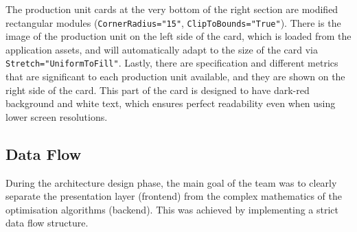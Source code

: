 The production unit cards at the very bottom of the right section are modified rectangular modules (\texttt{CornerRadius="15"}, \texttt{ClipToBounds="True"}). There is the image of the
production unit on the left side of the card, which is loaded from the application assets, and will automatically adapt to the size of the card via \texttt{Stretch="UniformToFill"}.
Lastly, there are specification and different metrics that are significant to each production unit available, and they are shown on the right side of the card. This part of the card is
designed to have dark-red background and white text, which ensures perfect readability even when using lower screen resolutions.

\subsection{Data Flow}
During the architecture design phase, the main goal of the team was to clearly separate the presentation layer (frontend) from the complex mathematics of the optimisation algorithms (backend). This was achieved by implementing a strict data flow structure.

